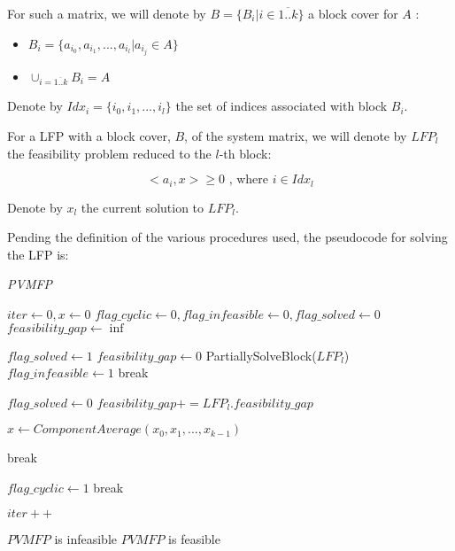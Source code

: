 \documentclass[a4paper,twoside,10pt]{report}
\begin{document}
	For such a matrix, we will denote by \(B = \{B_i|i\in\overline{1..k}\}\) a block cover for \(A\) :
	
	\begin{itemize}
		\item \(B_i = \{a_{i_0}, a_{i_1}, ... , a_{i_l} | a_{i_j}\in A\}\)
		\item \(\cup_{i=\overline{1..k}} B_i = A\)
	\end{itemize}
	
	Denote by \(Idx_i = \{i_0, i_1, ..., i_l\}\) the set of indices associated with block \(B_i\). 

	For a LFP with a block cover, \(B\), of the system matrix, we will denote by \(LFP_l\) the feasibility problem reduced to the \(l\)-th block:
	
	\[
		<a_i, x> \geq 0 \mbox{ , where } i\in Idx_l
	\]
	
	Denote by \(x_l\) the current solution to \(LFP_l\). 

	Pending the definition of the various procedures used, the pseudocode for solving the LFP is:
	
	\begin{algorithm}
	\caption{\textit{PVMFP}}
	\label{algPVMFP}
	\begin{center}
	\begin{algorithmic}
	
	\STATE \(iter\gets 0, x\gets 0\)
	\STATE \(flag{\_}cyclic \gets 0, flag{\_}infeasible \gets 0, flag{\_}solved \gets 0\)
	\STATE \(feasibility{\_}gap \gets \inf\)
	
		\STATE \(flag{\_}solved \gets 1\)
		\STATE \(feasibility{\_}gap \gets 0\)
			\STATE PartiallySolveBlock(\(LFP_l\))
				\STATE \(flag{\_}infeasible \gets 1\)
				\STATE break
			\ENDIF
			
				\STATE \(flag{\_}solved \gets 0\)
			\ELSE
				\STATE \(feasibility{\_}gap += LFP_l.feasibility{\_}gap\)
			\ENDIF								
		\ENDFOR
		
		\STATE \(x\gets ComponentAverage(x_0, x_1, ..., x_{k-1})\)
		
			\STATE break
		\ENDIF
		
			\STATE \(flag{\_}cyclic \gets 1 \)
			\STATE break
		\ENDIF
		
		\STATE \(iter++\)
		
	\ENDWHILE
	
	
		\RETURN \(PVMFP\) is infeasible
	\ELSE
		\RETURN \(PVMFP\) is feasible
	\ENDIF
	
	\end{algorithmic}
	\end{center}
	\end{algorithm}		
	
\end{document}
